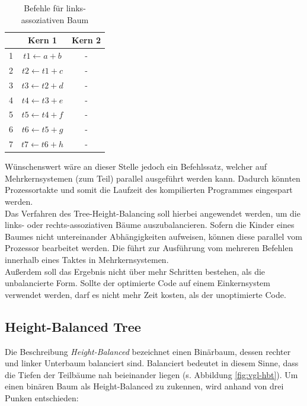 \begin{table}
	\begin{center}
		\begin{tabular}{|c|c|c|}
			\hline  & Kern 1 & Kern 2 \\ 
			\hline 1 & $ t1 \leftarrow a + b $& - \\ 
			\hline 2 & $ t2 \leftarrow t1 + c $& - \\ 
			\hline 3 & $ t3 \leftarrow t2 + d $& - \\ 
			\hline 4 & $ t4 \leftarrow t3 + e $& - \\ 
			\hline 5 & $ t5 \leftarrow t4 + f $& - \\ 
			\hline 6 & $ t6 \leftarrow t5 + g $& - \\ 
			\hline 7 & $ t7 \leftarrow t6 + h $& - \\ 
			\hline 
		\end{tabular}
	\end{center}
	\caption{Befehle für links-assoziativen Baum}
	\label{tab:links-assoziativer-baum}
\end{table}


Wünschenswert wäre an dieser Stelle jedoch ein Befehlssatz, welcher auf Mehrkernsystemen (zum Teil) parallel ausgeführt werden kann. Dadurch könnten Prozessortakte und somit die Laufzeit des kompilierten Programmes eingespart werden.\\
Das Verfahren des Tree-Height-Balancing soll hierbei angewendet werden, um die links- oder rechts-assoziativen Bäume auszubalancieren. Sofern die Kinder eines Baumes nicht untereinander Abhängigkeiten aufweisen, können diese parallel vom Prozessor bearbeitet werden. Die führt zur Ausführung vom mehreren Befehlen innerhalb eines Taktes in Mehrkernsystemen.\\
Außerdem soll das Ergebnis nicht über mehr Schritten bestehen, als die unbalancierte Form. Sollte der optimierte Code auf einem Einkernsystem verwendet werden, darf es nicht mehr Zeit kosten, als der unoptimierte Code.


\subsection{Height-Balanced Tree}
Die Beschreibung \textit{Height-Balanced} bezeichnet einen Binärbaum, dessen rechter und linker Unterbaum balanciert sind. Balanciert bedeutet in diesem Sinne, dass die Tiefen der Teilbäume nah beieinander liegen (s. Abbildung \ref{fig:vgl-hbt}\cite{geeks}).\cite{hbt}
Um einen binären Baum als Height-Balanced zu zukennen, wird anhand von drei Punken entschieden:

